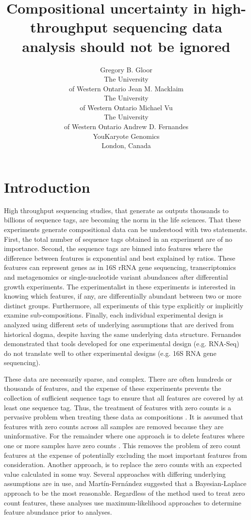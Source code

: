 \documentclass[article]{ajs}\usepackage[]{graphicx}\usepackage[]{color}
\author{Gregory B. Gloor\\The University\\ of Western Ontario \And 
        Jean M. Macklaim\\The University\\ of Western Ontario\And
        Michael Vu\\The University\\ of Western Ontario \And
         Andrew D. Fernandes\\YouKaryote Genomics\\ London, Canada  }
\title{Compositional uncertainty in high-throughput sequencing  data analysis should not be ignored}
\begin{document}



\section{Introduction}

High throughput sequencing studies, that   generate as outputs thousands to billions of sequence tags, are becoming the norm in the life sciences. That these experiments generate compositional data can be understood with two statements. First, the total number of sequence tags obtained in an experiment are of no importance. Second, the sequence tags are binned into features where the difference between features is exponential and best explained by ratios. These features can represent genes as in 16S rRNA gene sequencing, transcriptomics and metagenomics or single-nucleotide variant abundances after differential growth experiments. The experimentalist in these experiments is interested in knowing which features, if any, are differentially abundant between two or more distinct groups. Furthermore, all experiments of this type explicitly or implicitly examine sub-compositions. Finally, each individual experimental design is analyzed using different sets of underlying assumptions that are derived from historical dogma, despite having the same underlying data structure. Fernandes \citeyear{fernandes:2014} demonstrated that tools developed for one experimental design (e.g. RNA-Seq) do not translate well to other experimental designs (e.g. 16S RNA gene sequencing).

These data are necessarily sparse, and complex. There are often hundreds or thousands of features, and the expense of these experiments prevents the collection of sufficient sequence tags to ensure that all features are covered by at least one sequence tag. Thus, the treatment of features with zero counts is a pervasive problem when treating these data as compositions  \citep{lovell:2011}. It is assumed that features with zero counts across all samples are removed because they are uninformative. For the remainder where one approach is to  delete  features where one or more samples have zero counts  \citep{lovell:2011,lovell:2014}. This removes the problem of zero count features at the expense of   potentially excluding    the most important features from consideration. Another approach, is to replace the zero counts with an expected value calculated in some way. Several approaches with differing underlying assumptions are in use, and Mart\'{i}n-Fern\'{a}ndez \citeyear{fernandez:2014} suggested that a Bayesian-Laplace approach  to be the most reasonable. Regardless of the method used to treat zero count features, these analyses use maximum-likelihood approaches to determine feature abundance prior to analyses.
\end{document}
